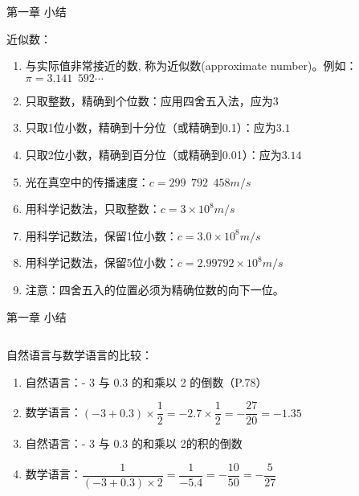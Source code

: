 \documentclass[aspectratio=169]{ctexbeamer} %
\begin{document}
\begin{frame}[t]{第一章 小结}
\begin{spacing}{1.2}
\normalsize
\alert{近似数：}
\begin{enumerate}[label={\arabic*.}]
\item 与实际值非常接近的数, 称为近似数(approximate number)。例如：\\
$\pi = 3.141\phantom{e}592\cdots$
\item 只取整数，精确到个位数：应用四舍五入法，应为$3$
\item 只取1位小数，精确到十分位（或精确到0.1）：应为$3.1$
\item 只取2位小数，精确到百分位（或精确到0.01）：应为$3.14$
\item 光在真空中的传播速度：$c=299 \phantom{e} 792 \phantom{e} 458m/s$
\item 用科学记数法，只取整数：$c=3×10^8m/s$
\item 用科学记数法，保留1位小数：$c=3.0×10^8m/s$
\item 用科学记数法，保留5位小数：$c=2.99792×10^8m/s$
\item 注意：四舍五入的位置必须为精确位数的向下一位。
\end{enumerate}

\end{spacing}
\end{frame}

\begin{frame}[t]{第一章 小结}
\begin{columns}
\begin{spacing}{1.2}
\normalsize
\alert{自然语言与数学语言的比较：}
\begin{enumerate}[label={(\alph*)}]
\item 自然语言：- 3 与 0.3 的和乘以 2 的倒数（P.78）
\item 数学语言：$(-3 + 0.3) × \dfrac{1}{2} = -2.7 × \dfrac{1}{2} = -\dfrac{27}{20} = -1.35$
\item 自然语言：- 3 与 0.3 的和乘以 2\alert{的积}的倒数
\item 数学语言：$\dfrac{1}{(-3 + 0.3) × {2}} = \dfrac{1}{-5.4} = -\dfrac{10}{50} = -\dfrac{5}{27}$

\end{enumerate}

\end{spacing}
\end{columns}
\end{frame}
\end{document}
